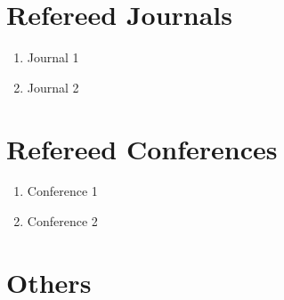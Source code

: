 \vspace{-1cm}
\section*{Refereed Journals}
\begin{enumerate}
	\item Journal 1
	\item Journal 2
\end{enumerate}

\section*{Refereed Conferences}
\begin{enumerate}
	\item Conference 1
	\item Conference 2
\end{enumerate}

\section*{Others}
